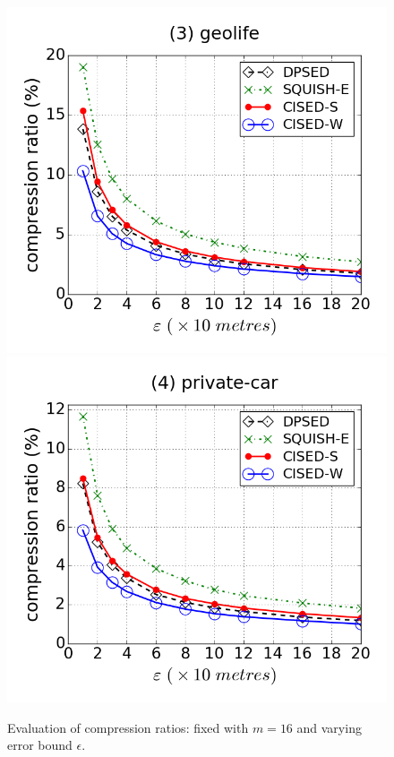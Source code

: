 \begin{figure}[tb!]
\includegraphics[scale = 0.240]{figures/Exp-cr-epsilon-geolife.png}
\includegraphics[scale = 0.240]{figures/Exp-cr-epsilon-private.png}
\vspace{-1ex}
\caption{\small Evaluation of compression ratios: fixed with $m=16$ and varying error bound $\epsilon$.}
\label{fig:cr-m16}
\vspace{-1.0ex}
\end{figure}


